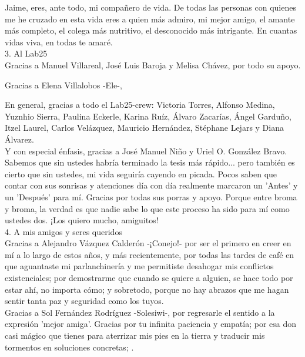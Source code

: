 \documentclass[
11pt, %
spanish, %
singlespacing, %
headsepline, %
]{MastersDoctoralThesis} %
\begin{document}
\begin{acknowledgements}
Jaime, eres, ante todo, mi compañero de vida. De todas las personas con quienes me he cruzado en esta vida eres a quien más admiro, mi mejor amigo, el amante más completo, el colega más nutritivo, el desconocido más intrigante. En cuantas vidas viva, en todas te amaré.\\

3. Al Lab25\\

Gracias a Manuel Villareal, José Luis Baroja y Melisa Chávez, por todo su apoyo.

Gracias a Elena Villalobos -Ele-,  

En general, gracias a todo el Lab25-crew: Victoria Torres, Alfonso Medina, Yuznhio Sierra, Paulina Eckerle, Karina Ruíz, Álvaro Zacarías, Ángel Garduño, Itzel Laurel, Carlos Velázquez, Mauricio Hernández, Stéphane Lejars y Diana Álvarez.\\


Y con especial énfasis, gracias a José Manuel Niño y Uriel O. González Bravo. Sabemos que sin ustedes habría terminado la tesis más rápido... pero también es cierto que sin ustedes, mi vida seguiría cayendo en picada. Pocos saben que contar con sus sonrisas y atenciones día con día realmente marcaron un 'Antes' y un 'Después' para mí. Gracias por todas sus porras y apoyo. Porque entre broma y broma, la verdad es que nadie sabe lo que este proceso ha sido para mí como ustedes dos. ¡Los quiero mucho, amiguitos!\\

4. A mis amigos y seres queridos\\


Gracias a Alejandro Vázquez Calderón -¡Conejo!- por ser el primero en creer en mí a lo largo de estos años, y más recientemente, por todas las tardes de café en que aguantaste mi parlanchinería y me permitiste desahogar mis conflictos existenciales; por demostrarme que cuando se quiere a alguien, se hace todo por estar ahí, no importa cómo; y sobretodo, porque no hay abrazos que me hagan sentir tanta paz y seguridad como los tuyos.\\

Gracias a Sol Fernández Rodríguez -Solesiwi-, por regresarle el sentido a la expresión 'mejor amiga'. Gracias por tu infinita paciencia y empatía; por esa don casi mágico que tienes para aterrizar mis pies en la tierra y traducir mis tormentos en soluciones concretas; .\\


\end{acknowledgements}
\end{document}
